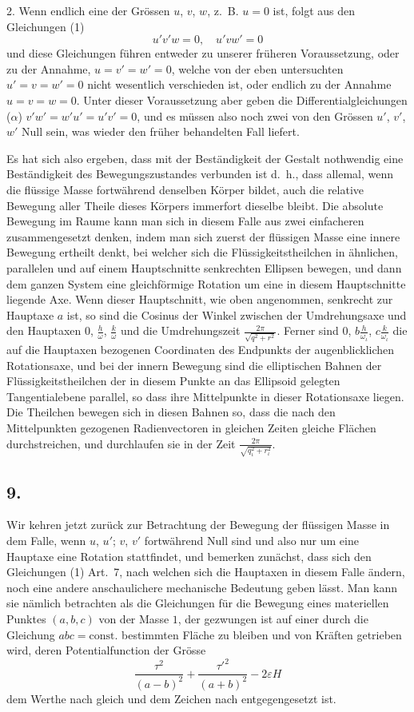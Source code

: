 \documentclass[12pt,a4paper]{book}
\theoremstyle{definition}
\theoremstyle{remark}
\begin{document}
2. Wenn endlich eine der Grössen $u$, $v$, $w$, z.~B. $u = 0$ ist, folgt aus den Gleichungen (1)
\[ u'v'w = 0,\quad u'vw' = 0 \]
und diese Gleichungen führen entweder zu unserer früheren Voraussetzung, oder zu der Annahme, $u = v' = w' = 0$, welche von der eben untersuchten $u' = v = w' = 0$ nicht wesentlich verschieden ist, oder endlich zu der Annahme $u = v = w = 0$. Unter dieser Voraussetzung aber geben die Differentialgleichungen ($\alpha$) $v'w' = w'u' = u'v' = 0$, und es müssen also noch zwei von den Grössen $u'$, $v'$, $w'$ Null sein, was wieder den früher behandelten Fall liefert.

Es hat sich also ergeben, dass mit der Beständigkeit der Gestalt nothwendig eine Beständigkeit des Bewegungszustandes verbunden ist d.~h., dass allemal, wenn die flüssige Masse fortwährend denselben Körper bildet, auch die relative Bewegung aller Theile dieses Körpers immerfort dieselbe bleibt. Die absolute Bewegung im Raume kann man sich in diesem Falle aus zwei einfacheren zusammengesetzt denken, indem man sich zuerst der flüssigen Masse eine innere Bewegung ertheilt denkt, bei welcher sich die Flüssigkeitstheilchen in ähnlichen, parallelen und auf einem Hauptschnitte senkrechten Ellipsen bewegen, und dann dem ganzen System eine gleichförmige Rotation um eine in diesem Hauptschnitte liegende Axe. Wenn dieser Hauptschnitt, wie oben angenommen, senkrecht zur Hauptaxe $a$ ist, so sind die Cosinus der Winkel zwischen der Umdrehungsaxe und den Hauptaxen $0$, $\frac{h}{\omega}$, $\frac{k}{\omega}$ und die Umdrehungszeit $\frac{2\pi}{\sqrt{q^2+r^2}}$. Ferner sind $0$, $b\frac{h}{\omega_\iota}$, $c\frac{k}{\omega_\iota}$ die auf die Hauptaxen bezogenen Coordinaten des Endpunkts der augenblicklichen Rotationsaxe, und bei der innern Bewegung sind die elliptischen Bahnen der Flüssigkeitstheilchen der in diesem Punkte an das Ellipsoid gelegten Tangentialebene parallel, so dass ihre Mittelpunkte in dieser Rotationsaxe liegen. Die Theilchen bewegen sich in diesen Bahnen so, dass die nach den Mittelpunkten gezogenen Radienvectoren in gleichen Zeiten gleiche Flächen durchstreichen, und durchlaufen sie in der Zeit $\frac{2\pi}{\sqrt{q_\iota^2 + r_\iota^2}}$.

\subsection*{9.}

Wir kehren jetzt zurück zur Betrachtung der Bewegung der flüssigen Masse in dem Falle, wenn $u$, $u'$; $v$, $v'$ fortwährend Null sind und also nur um eine Hauptaxe eine Rotation stattfindet, und bemerken zunächst, dass sich den Gleichungen (1) Art.~7, nach welchen sich die Hauptaxen in diesem Falle ändern, noch eine andere anschaulichere mechanische Bedeutung geben lässt. Man kann sie nämlich betrachten als die Gleichungen für die Bewegung eines materiellen Punktes $(a, b, c)$ von der Masse $1$, der gezwungen ist auf einer durch die Gleichung $abc = \text{const.}$ bestimmten Fläche zu bleiben und von Kräften getrieben wird, deren Potentialfunction der Grösse
\[ \frac{\tau^2}{(a-b)^2} + \frac{\tau'^2}{(a+b)^2} - 2\varepsilon H \]
dem Werthe nach gleich und dem Zeichen nach entgegengesetzt ist.
\end{document}
